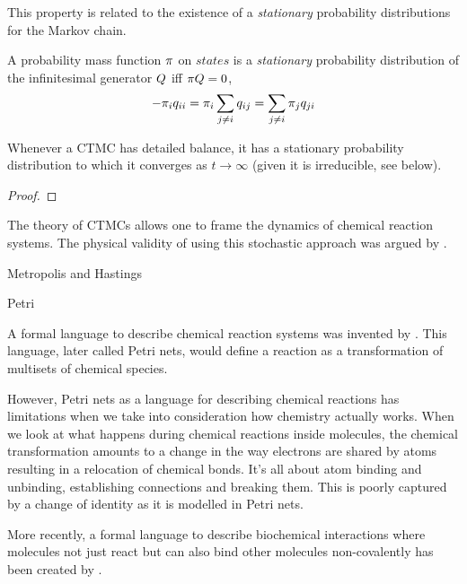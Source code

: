 This property is related to the existence of a
\emph{stationary} probability distributions for the Markov chain.

\begin{definition}
  A probability mass function $\pi$ on $states$ is
  a \emph{stationary} probability distribution of
  the infinitesimal generator $Q$ iff $\pi Q = 0$, \ie
  \[ -\pi_i q_{ii} = \pi_i \sum_{j \neq i} q_{ij}
                  = \sum_{j \neq i} \pi_j q_{ji} \]
\end{definition}

Whenever a CTMC has detailed balance,
it has a stationary probability distribution
to which it converges as $t \to \infty$
(given it is irreducible, see below).

\begin{lemma}
\end{lemma}
\begin{proof}
\end{proof}

The theory of CTMCs allows one to frame the dynamics of
chemical reaction systems.
The physical validity of using this stochastic approach
was argued by \citet{gillespie76}.

Metropolis and Hastings

Petri

A formal language to describe chemical reaction systems
was invented by \citet{petri}.
This language, later called Petri nets,
would define a reaction as a transformation of
multisets of chemical species.

However, Petri nets as a language for describing chemical reactions
has limitations when we take into consideration
how chemistry actually works.
When we look at what happens during chemical reactions
inside molecules, the chemical transformation amounts to
a change in the way electrons are shared by atoms
resulting in a relocation of chemical bonds.
It's all about atom binding and unbinding,
establishing connections and breaking them.
This is poorly captured by a change  of identity
as it is modelled in Petri nets.

More recently,
a formal language to describe biochemical interactions
where molecules not just react but can also bind other molecules
non-covalently has been created by \citet{danoslaneve2002a}.


















